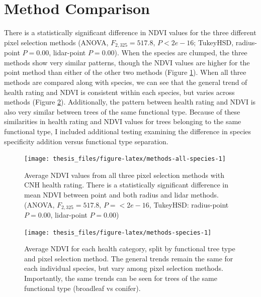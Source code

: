 \documentclass[12pt,twoside]{reedthesis}
\begin{document}
\hypertarget{method-comparison}{%
\section{Method Comparison}\label{method-comparison}}

There is a statistically significant difference in NDVI values for the three different pixel selection methods (ANOVA, \(F_{2, 325}=517.8\), \(P < 2e-16\); TukeyHSD, radius-point \(P = 0.00\), lidar-point \(P = 0.00\)). When the species are clumped, the three methods show very similar patterns, though the NDVI values are higher for the point method than either of the other two methods (Figure \ref{fig:methods-all-species}). When all three methods are compared along with species, we can see that the general trend of health rating and NDVI is consistent within each species, but varies across methods (Figure \ref{fig:methods-species}). Additionally, the pattern between health rating and NDVI is also very similar between trees of the same functional type. Because of these similarities in health rating and NDVI values for trees belonging to the same functional type, I included additional testing examining the difference in species specificity addition versus functional type separation.
\begin{figure}

{\centering \texttt{[image: thesis\_files/figure-latex/methods-all-species-1]} 

}

\caption[NDVI and health rating comparison across methods]{Average NDVI values from all three pixel selection methods with CNH health rating. There is a statistically significant difference in mean NDVI between point and both radius and lidar methods. (ANOVA, $F_{2, 325}=517.8$, $P = <2e-16$, TukeyHSD: radius-point $P = 0.00$, lidar-point $P = 0.00$)}\label{fig:methods-all-species}
\end{figure}
\begin{figure}

{\centering \texttt{[image: thesis\_files/figure-latex/methods-species-1]} 

}

\caption[Average NDVI comparison between species and methods.]{Average NDVI for each health category, split by functional tree type and pixel selection method. The general trends remain the same for each individual species, but vary among pixel selection methods. Importantly, the same trends can be seen for trees of the same functional type (broadleaf vs conifer). }\label{fig:methods-species}
\end{figure}
\end{document}
